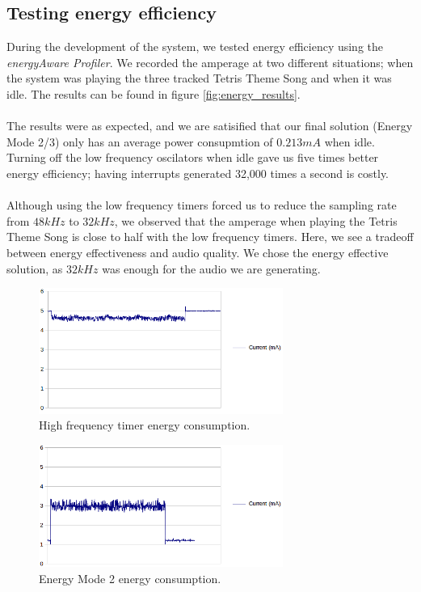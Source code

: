 \subsection{Testing energy efficiency}
During the development of the system, we tested energy efficiency using the \emph{energyAware Profiler}. We recorded the amperage at two different situations; when the system was playing the three tracked Tetris Theme Song and when it was idle. The results can be found in figure \ref{fig:energy_results}. \\
\\
The results were as expected, and we are satisified that our final solution (Energy Mode 2/3) only has an average power consupmtion of $0.213mA$ when idle. Turning off the low frequency oscilators when idle gave us five times better energy efficiency; having interrupts generated 32,000 times a second is costly.\\
\\
Although using the low frequency timers forced us to reduce the sampling rate from $48kHz$ to $32kHz$, we observed that the amperage when playing the Tetris Theme Song is close to half with the low frequency timers. Here, we see a tradeoff between energy effectiveness and audio quality. We chose the energy effective solution, as $32kHz$ was enough for the audio we are generating.

\begin{figure}[hf]
	\centering
	\includegraphics[width=8cm]{img/hf.png}
	\caption{High frequency timer energy consumption.}
	\label{fig:hf}
\end{figure}
	
\begin{figure}[hf]
	\centering
	\includegraphics[width=8cm]{img/em3.png}
	\caption{Energy Mode 2 energy consumption.}
	\label{fig:em3}
\end{figure}

